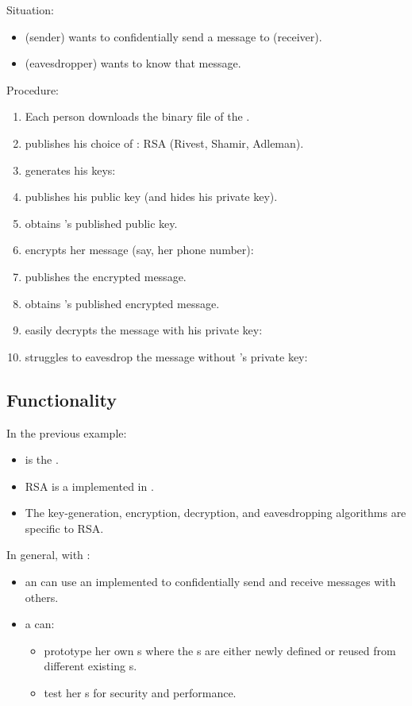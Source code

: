 \documentclass[11pt]{extarticle}
\begin{document}
\begin{flushleft}
Situation:
\begin{itemize}
\item
  \alice{} (sender) wants to confidentially send a message
  to \bob{} (receiver).
\item
  \eve{} (eavesdropper) wants to know that message.
\end{itemize}

Procedure:
\begin{enumerate}
\item
  Each person downloads the binary file 
  of the \cry{} \cf.
\item
  \bob{} publishes his choice of \cs:
  RSA (Rivest, Shamir, Adleman).
\item
  \bob{} generates his keys: \getkeysex
\item
  \bob{} publishes his public key
  (and hides his private key).
\item
  \alice{} obtains \bob's published public key.
\item
  \alice{} encrypts her message (say, her phone number):
  \encryptex
\item
  \alice{} publishes the encrypted message.
\item
  \bob{} obtains \alice's published encrypted message.
\item
  \bob{} easily decrypts the message with his private key:
  \decryptex
\item
  \eve{} struggles to eavesdrop the message
  without \bob's private key: \eavesdropex
\end{enumerate}


\subsection{Functionality}

In the previous example:
\begin{itemize}
\item
  \cry{} is the \cf.
\item
  RSA is a \cs{} implemented in \cry.
\item
  The key-generation, encryption, decryption,
  and eavesdropping algorithms are specific to RSA.
\end{itemize}

In general, with \cry:
\begin{itemize}
\item an \eu{} can use an implemented \cs{}
  to confidentially send and receive messages with others.
\item a \cg{} can:
  \begin{itemize}
  \item prototype her own \cs s
    where the \ca s are either newly defined
    or reused from different existing \cs s.
  \item test her \cs s for security and performance.
  \end{itemize}
\end{itemize}


\end{flushleft}
\end{document}
